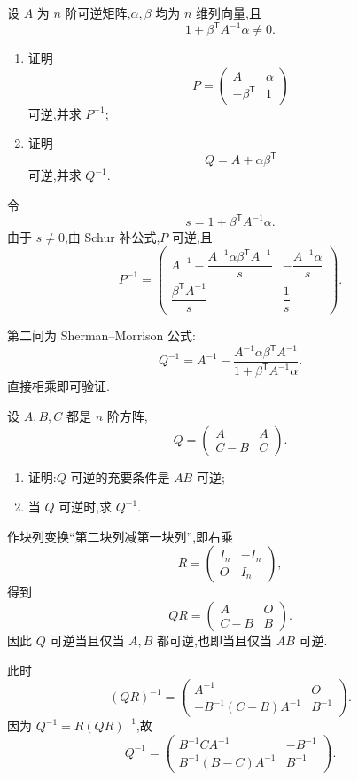 \begin{example}
设 $A$ 为 $n$ 阶可逆矩阵,$\alpha,\beta$ 均为 $n$ 维列向量,且
\[
1+\beta^{\mathsf T}A^{-1}\alpha\neq0.
\]
\begin{enumerate}
  \item 证明
  \[
  P=\begin{pmatrix}A&\alpha\\-\beta^{\mathsf T}&1\end{pmatrix}
  \]
  可逆,并求 $P^{-1}$;
  \item 证明
  \[
  Q=A+\alpha\beta^{\mathsf T}
  \]
  可逆,并求 $Q^{-1}$.
\end{enumerate}
\end{example}
\exampleblank

\begin{solution}
令
\[
s=1+\beta^{\mathsf T}A^{-1}\alpha.
\]
由于 $s\neq0$,由 Schur 补公式,$P$ 可逆,且
\[
\boxed{
P^{-1}
=
\begin{pmatrix}
A^{-1}-\dfrac{A^{-1}\alpha\beta^{\mathsf T}A^{-1}}{s}
&-\dfrac{A^{-1}\alpha}{s}\\[8pt]
\dfrac{\beta^{\mathsf T}A^{-1}}{s}
&\dfrac{1}{s}
\end{pmatrix}
}.
\]

第二问为 Sherman--Morrison 公式:
\[
\boxed{
Q^{-1}
=A^{-1}
-\dfrac{A^{-1}\alpha\beta^{\mathsf T}A^{-1}}
{1+\beta^{\mathsf T}A^{-1}\alpha}
}.
\]
直接相乘即可验证.
\end{solution}

\begin{example}
设 $A,B,C$ 都是 $n$ 阶方阵,
\[
Q=
\begin{pmatrix}
A&A\\
C-B&C
\end{pmatrix}.
\]
\begin{enumerate}
  \item 证明:$Q$ 可逆的充要条件是 $AB$ 可逆;
  \item 当 $Q$ 可逆时,求 $Q^{-1}$.
\end{enumerate}
\end{example}
\exampleblank

\begin{solution}
作块列变换``第二块列减第一块列'',即右乘
\[
R=\begin{pmatrix}I_n&-I_n\\O&I_n\end{pmatrix},
\]
得到
\[
QR
=
\begin{pmatrix}
A&O\\
C-B&B
\end{pmatrix}.
\]
因此 $Q$ 可逆当且仅当 $A,B$ 都可逆,也即当且仅当 $AB$ 可逆.

此时
\[
(QR)^{-1}
=
\begin{pmatrix}
A^{-1}&O\\
-B^{-1}(C-B)A^{-1}&B^{-1}
\end{pmatrix}.
\]
因为 $Q^{-1}=R(QR)^{-1}$,故
\[
\boxed{
Q^{-1}
=
\begin{pmatrix}
B^{-1}CA^{-1}&-B^{-1}\\
B^{-1}(B-C)A^{-1}&B^{-1}
\end{pmatrix}
}.
\]
\end{solution}

